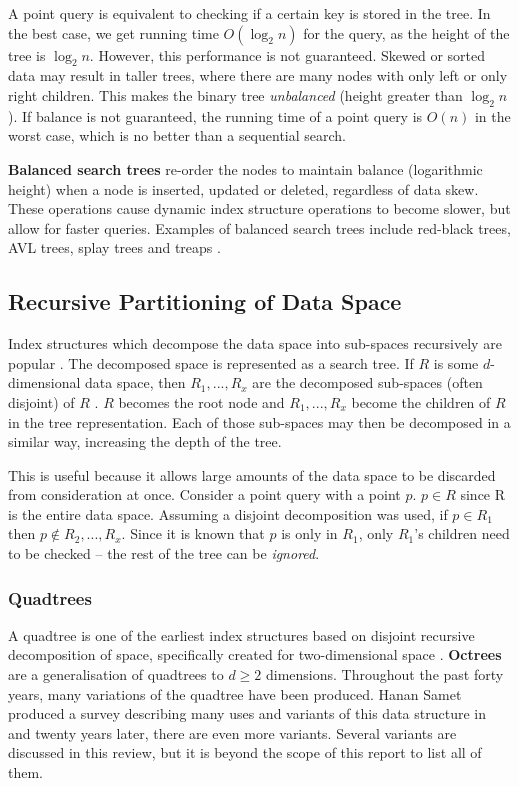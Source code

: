 A point query is equivalent to checking if a certain key is stored in the tree. In the best case, we get running time $O(\log_2 n)$ for the query, as the height of the tree is $\log_2 n$. However, this performance is not guaranteed. Skewed or sorted data may result in taller trees, where there are many nodes with only left or only right children. This makes the binary tree \textit{unbalanced} (height greater than $\log_2 n$). If balance is not guaranteed, the running time of a point query is $O(n)$ in the worst case, which is no better than a sequential search.

\textbf{Balanced search trees} re-order the nodes to maintain balance (logarithmic height) when a node is inserted, updated or deleted, regardless of data skew. These operations cause dynamic index structure operations to become slower, but allow for faster queries. Examples of balanced search trees include red-black trees, AVL trees, splay trees and treaps \cite{introduction-to-algorithms}.

\subsection{Recursive Partitioning of Data Space}
\label{sec:recursive-partition-structures}

Index structures which decompose the data space into sub-spaces recursively are popular \cite{md-structures-samet}. The decomposed space is represented as a search tree. If $R$ is some $d$-dimensional data space, then $R_1,...,R_x$ are the decomposed sub-spaces (often disjoint) of $R$ . $R$ becomes the root node and $R_1,...,R_x$ become the children of $R$ in the tree representation. Each of those sub-spaces may then be decomposed in a similar way, increasing the depth of the tree.

This is useful because it allows large amounts of the data space to be discarded from consideration at once. Consider a point query with a point $p$. $p \in R$ since R is the entire data space. Assuming a disjoint decomposition was used, if $p \in R_1$ then $p \not\in R_2,...,R_x$. Since it is known that $p$ is only in $R_1$, only $R_1$'s children need to be checked -- the rest of the tree can be \textit{ignored}.

\subsubsection{Quadtrees}

A quadtree is one of the earliest index structures based on disjoint recursive decomposition of space, specifically created for two-dimensional space \cite{original-quadtree}. \textbf{Octrees} are a generalisation of quadtrees to $d \geq 2$ dimensions. Throughout the past forty years, many variations of the quadtree have been produced. Hanan Samet produced a survey describing many uses and variants of this data structure in  \cite{quadtree} and twenty years later, there are even more variants. Several variants are discussed in this review, but it is beyond the scope of this report to list all of them.

